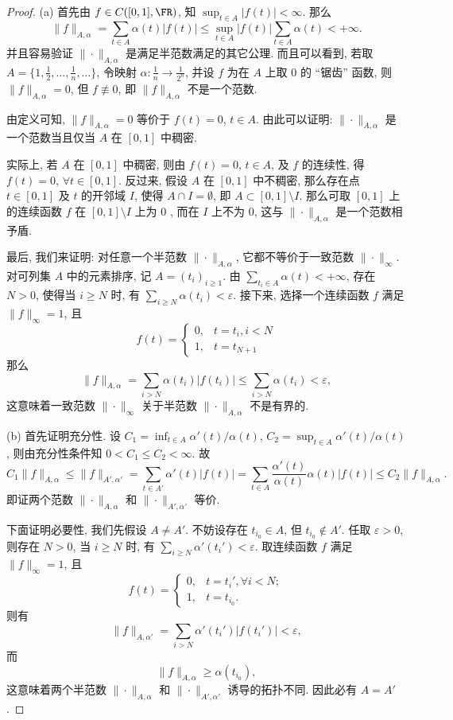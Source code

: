 \begin{proof}
    (a) 首先由 $f \in C([0,1], \FR)$, 知 $\sup_{t \in A}|f(t)|<\infty$. 那么
    \[\|f\|_{A,\alpha}=\sum_{t\in A}\alpha(t)|f(t)|\leq\sup_{t\in A}|f(t)|\sum_{t \in A} \alpha(t)<+\infty.\]
    并且容易验证 $\|\cdot\|_{A, \alpha}$ 是满足半范数满足的其它公理. 
    而且可以看到, 若取 $A=\{1,\frac{1}{2},\ldots,\frac{1}{n},\ldots\}$, 
    令映射 $\alpha: \frac{1}{n} \rightarrow \frac{1}{2^{n}}$, 
    并设 $f$ 为在 $A$ 上取 $0$ 的 “锯齿” 函数, 则 $\|f\|_{A,\alpha}=0$, 但 $f\not\equiv 0$, 即 $\|f\|_{A,\alpha}$ 不是一个范数.

    由定义可知, $\|f\|_{A, \alpha}=0$ 等价于 $f(t)=0$, $t\in A$. 由此可以证明: $\|\cdot\|_{A, \alpha}$ 
    是一个范数当且仅当 $A$ 在 $[0,1]$ 中稠密.

    实际上, 若 $A$ 在 $[0,1]$ 中稠密, 则由 $f(t)=0$, $t\in A$, 及 $f$ 的连续性, 得 $f(t)=0$, $\forall t \in[0,1]$. 
    反过来, 假设 $A$ 在 $[0,1]$ 中不稠密, 那么存在点 $t\in[0,1]$
    及 $t$ 的开邻域 $I$, 使得 $A\cap I=\emptyset$, 即 $A \subset[0,1]\setminus I$.
    那么可取 $[0,1]$ 上的连续函数 $f$ 在 $[0,1]\setminus I$ 上为 $0$ , 而在 $I$ 上不为 $0$, 
    这与 $\|\cdot\|_{A,\alpha}$ 是一个范数相予盾.

    最后, 我们来证明: 对任意一个半范数 $\|\cdot\|_{A,\alpha}$, 它都不等价于一致范数 $\|\cdot\|_{\infty}$.
    对可列集 $A$ 中的元素排序, 记 $A=(t_{i})_{i\geq 1}$. 
    由 $\sum_{t_i\in A} \alpha(t)<+\infty$, 存在 $N>0$, 使得当 $i\geq N$ 时, 
    有 $\sum_{i \geq N} \alpha(t_i)<\varepsilon$. 接下来, 选择一个连续函数 $f$ 满足 $\|f\|_{\infty}=1$, 且
    \[
    f(t)= \begin{cases}0, & t=t_{i}, i<N \\ 1, & t=t_{N+1}\end{cases}
    \]
    那么
    \[
    \|f\|_{A,\alpha}=\sum_{i>N} \alpha(t_i)|f(t_i)|\leq\sum_{i>N} \alpha(t_i)<\varepsilon,
    \]
    这意味着一致范数 $\|\cdot\|_{\infty}$ 关于半范数 $\|\cdot\|_{A,\alpha}$ 不是有界的.

    (b) 首先证明充分性. 设 $C_1=\inf_{t\in A}\alpha'(t)/\alpha(t)$, 
    $C_{2}=\sup_{t \in A} \alpha'(t)/\alpha(t)$, 则由充分性条件知 $0<C_1\leq C_2<\infty$. 故
    \[C_{1}\|f\|_{A,\alpha}\leq\|f\|_{A',\alpha'}=\sum_{t\in A'} \alpha'(t)|f(t)|=\sum_{t\in A} \frac{\alpha'(t)}{\alpha(t)} \alpha(t)|f(t)|\leq C_{2}\|f\|_{A,\alpha}.\]
    即证两个范数 $\|\cdot\|_{A, \alpha}$ 和 $\|\cdot\|_{A', \alpha'}$ 等价.

    下面证明必要性, 我们先假设 $A\neq A'$. 
    不妨设存在 $t_{i_0}\in A$, 但 $t_{i_{0}}\notin A'$. 任取 $\varepsilon>0$, 则存在 $N>0$, 
    当 $i\geq N$ 时, 有 $\sum_{i\geq N} \alpha'(t_i')<\varepsilon$. 取连续函数 $f$ 满足 $\|f\|_{\infty}=1$, 且
    \[f(t)=\begin{cases} 0, & t=t_{i}',\forall i<N; \\ 1, & t=t_{i_{0}} .\end{cases}\]
    则有
    \[\|f\|_{A,\alpha'}=\sum_{i>N} \alpha'(t_{i}')|f(t_{i}')|<\varepsilon,\]
    而
    \[\|f\|_{A, \alpha}\geq\alpha(t_{i_0}),\]
    这意味着两个半范数 $\|\cdot\|_{A, \alpha}$ 和 $\|\cdot\|_{A', \alpha'}$ 诱导的拓扑不同. 因此必有 $A=A'$.


\end{proof}
